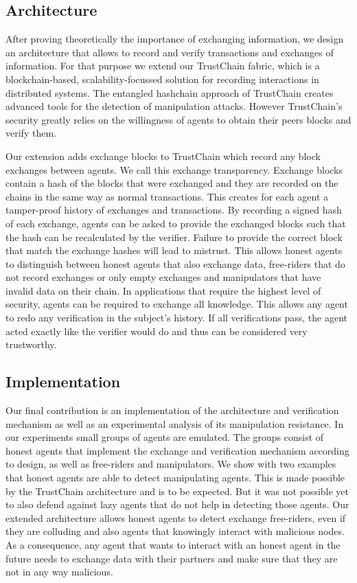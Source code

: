\subsection{Architecture}
After proving theoretically the importance of exchanging information, we design an architecture that allows to 
record and verify transactions and exchanges of information. For that purpose we extend our
TrustChain fabric, which is a blockchain-based, scalability-focussed solution for recording 
interactions in distributed systems. The entangled hashchain approach of TrustChain creates advanced
tools for the detection of manipulation attacks. However TrustChain's security greatly relies on the
willingness of agents to obtain their peers blocks and verify them. 

Our extension adds exchange blocks to TrustChain which record any block exchanges between agents. We call
this exchange transparency.
Exchange blocks contain a hash of the blocks that were exchanged and they are recorded on the chains
in the same way as normal transactions. This creates for each agent a tamper-proof history of exchanges and
transactions. By recording a signed hash of each exchange, agents can be asked to provide the exchanged
blocks such that the hash can be recalculated by the verifier. Failure to provide the correct block that
match the exchange hashes will lead to mistrust. This allows honest agents to distinguish
between honest agents that also exchange data, free-riders that do not record exchanges or only empty
exchanges and manipulators that have invalid data on their chain. In applications that require the 
highest level of security, agents can be required to exchange all knowledge. This allows any agent 
to redo any verification in the subject's history. If all verifications pass, the agent acted exactly
like the verifier would do and thus can be considered very trustworthy.

\subsection{Implementation}
Our final contribution is an implementation of the architecture and verification mechanism as well as
an experimental analysis of its manipulation resistance. In our experiments small groups of agents 
are emulated. The groups consist of honest agents that implement the exchange and verification 
mechanism according to design, as well as free-riders and manipulators. We show with two examples
that honest agents are able to detect manipulating agents. This is made possible by the TrustChain 
architecture and is to be expected. But it was not possible yet to also defend against lazy agents
that do not help in detecting those agents. Our extended architecture allows honest agents to 
detect exchange free-riders, even if they are colluding and also agents that knowingly interact with
malicious nodes. As a consequence, any agent that wants to interact with an honest agent in the future
needs to exchange data with their partners and make sure that they are not in any way malicious.

